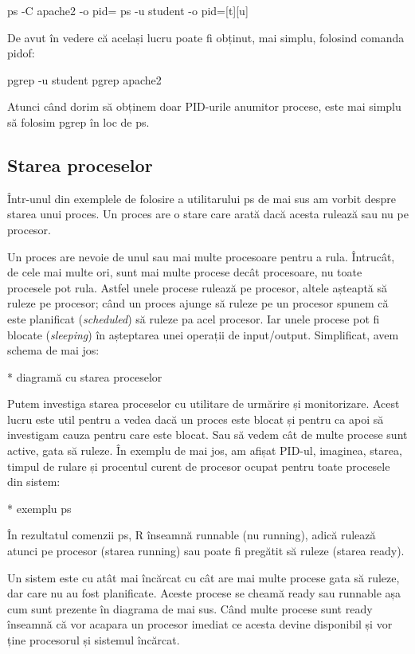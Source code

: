 \begin{screen}
ps -C apache2 -o pid=
ps -u student -o pid=[t][u]
\end{screen}

De avut în vedere că același lucru poate fi obținut, mai simplu, folosind
comanda pidof:

\begin{screen}
pgrep -u student
pgrep apache2
\end{screen}

Atunci când dorim să obținem doar PID-urile anumitor procese, este mai simplu să
folosim pgrep în loc de ps.

\subsection{Starea proceselor}
\label{sec:procese-resurse-stare}

Într-unul din exemplele de folosire a utilitarului ps de mai sus am vorbit
despre starea unui proces. Un proces are o stare care arată dacă acesta rulează
sau nu pe procesor.

Un proces are nevoie de unul sau mai multe procesoare pentru a rula. Întrucât,
de cele mai multe ori, sunt mai multe procese decât procesoare, nu toate
procesele pot rula. Astfel unele procese rulează pe procesor, altele așteaptă să
ruleze pe procesor; când un proces ajunge să ruleze pe un procesor spunem că
este planificat (\textit{scheduled}) să ruleze pa acel procesor. Iar unele
procese pot fi blocate (\textit{sleeping}) în așteptarea unei operații de
input/output. Simplificat, avem schema de mai jos:

* diagramă cu starea proceselor

Putem investiga starea proceselor cu utilitare de urmărire și monitorizare.
Acest lucru este util pentru a vedea dacă un proces este blocat și pentru ca
apoi să investigam cauza pentru care este blocat. Sau să vedem cât de multe
procese sunt active, gata să ruleze. În exemplu de mai jos, am afișat PID-ul,
imaginea, starea, timpul de rulare și procentul curent de procesor ocupat pentru
toate procesele din sistem:

* exemplu ps

În rezultatul comenzii ps, R înseamnă runnable (nu running), adică rulează
atunci pe procesor (starea running) sau poate fi pregătit să ruleze (starea
ready).

Un sistem este cu atât mai încărcat cu cât are mai multe procese gata să ruleze,
dar care nu au fost planificate. Aceste procese se cheamă ready sau runnable așa
cum sunt prezente în diagrama de mai sus. Când multe procese sunt ready înseamnă
că vor acapara un procesor imediat ce acesta devine disponibil și vor ține
procesorul și sistemul încărcat.

